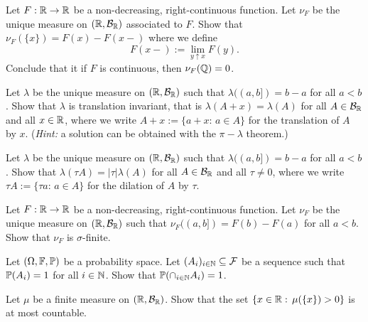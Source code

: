 \begin{problem}  Let $F:\mathbb R\to \mathbb R$ be a non-decreasing, right-continuous function. Let $\nu_F$ be the unique measure on $(\mathbb R,\mathcal B_{\mathbb R})$ associated to $F$. Show that $\nu_F(\{x\}) = F(x)-F(x-)$ where we define 
    \begin{equation*}
        F(x-) := \lim_{y\uparrow x} F(y).
    \end{equation*} 
Conclude that it if $F$ is continuous, then $\nu_F(\mathbb Q) = 0$.
\end{problem}

\begin{problem} Let $\lambda$ be the unique measure on $(\mathbb R,\mathcal B_{\mathbb R})$ such that $\lambda((a,b]) = b-a$ for all $a<b$. Show that $\lambda$ is translation invariant, that is $\lambda(A+x) = \lambda(A)$ for all $A\in \mathcal B_{\mathbb R}$ and all $x\in \mathbb R$, where we write $A+x := \{a+x:\, a\in A\}$ for the translation of $A$ by $x$.
(\emph{Hint:} a solution can be obtained with the $\pi-\lambda$ theorem.)    
\end{problem}

\begin{problem} Let $\lambda$ be the unique measure on $(\mathbb R,\mathcal B_{\mathbb R})$ such that $\lambda((a,b]) = b-a$ for all $a<b$. Show that $\lambda(\tau A) = |\tau|\lambda(A)$ for all $A\in \mathcal B_{\mathbb R}$ and all $\tau\neq 0$, where we write $\tau A := \{\tau a:\, a\in A\}$ for the dilation of $A$ by $\tau$.
\end{problem}

\begin{problem}
    Let $F:\mathbb R\to \mathbb R$ be a non-decreasing, right-continuous function. Let $\nu_F$ be the unique measure on $(\mathbb R,\mathcal B_{\mathbb R})$ such that $\nu_F((a,b]) = F(b)-F(a)$ for all $a<b$. Show that $\nu_F$ is $\sigma$-finite.
\end{problem}

\begin{problem}
    Let $(\Omega,\mathbb F,\mathbb P)$ be a probability space. Let $(A_i)_{i\in \mathbb N}\subseteq \mathcal F$ be a sequence such that $\mathbb P(A_i)=1$ for all $i\in\mathbb N$. Show that $\mathbb P(\cap_{i\in \mathbb N} A_i) = 1$.
\end{problem}

\begin{problem}
    Let $\mu$ be a finite measure on $(\mathbb R,\mathcal B_{\mathbb R})$. Show that the set $\{x\in \mathbb R:\, \mu(\{x\})>0\}$ is at most countable.
\end{problem}

